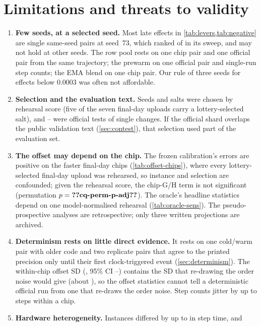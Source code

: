 \section{Limitations and threats to validity}
\label{sec:limits}

\begin{enumerate}
  \item \textbf{Few seeds, at a selected seed.} Most late effects in \cref{tab:levers,tab:negative} are single
    same-seed pairs at seed~73, which ranked  of  in its sweep, and may not hold at
    other seeds. The row pool rests on one chip pair and one official pair from the same trajectory; the prewarm on
    one official pair and single-run step counts; the EMA blend on one chip pair. Our rule of three seeds for effects below 0.0003
    was often not affordable.
  \item \textbf{Selection and the evaluation text.} Seeds and salts were chosen by rehearsal score (five of the seven
    final-day uploads carry a lottery-selected salt), and -- were official tests of single
    changes. If the official shard overlaps the public validation text (\cref{sec:contest}), that selection used part
    of the evaluation set.
  \item \textbf{The offset may depend on the chip.} The frozen calibration's errors are positive on the faster
    final-day chips (\cref{tab:offset-chips}), where every lottery-selected final-day upload was rehearsed, so
    instance and selection are confounded; given the rehearsal score, the chip-G/H term is not significant
    (permutation $p=\val{cq-perm-p-adj}$). The oracle's headline statistics depend on one model-normalised rehearsal
    (\cref{tab:oracle-sens}). The pseudo-prospective analyses are retrospective; only three written projections are
    archived.
  \item \textbf{Determinism rests on little direct evidence.} It rests on one cold/warm pair with older code and two replicate
    pairs that agree to the printed precision only until their first clock-triggered event
    (\cref{sec:determinism}). The within-chip offset SD
    (, 95\% CI --) contains the SD that re-drawing the
    order noise would give (about ), so the offset statistics cannot tell a deterministic official run from one that re-draws the order noise. Step counts jitter by up to
     steps within a chip.
  \item \textbf{Hardware heterogeneity.} Instances differed by up to \docnum{} in step time, and

\end{enumerate}
